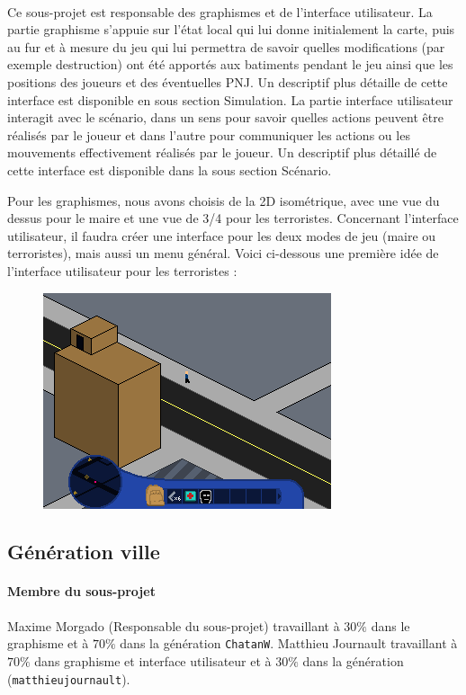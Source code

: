 \documentclass[a4paper,10pt]{article}
\begin{document}
\paragraph{} Ce sous-projet est responsable des graphismes et de l'interface utilisateur. 
La partie graphisme s'appuie sur l'état local qui lui donne initialement la carte, puis au fur et à mesure du jeu qui lui permettra de savoir quelles modifications (par exemple destruction) ont été apportés aux batiments pendant le jeu ainsi que les positions des joueurs et des éventuelles PNJ. Un descriptif plus détaille de cette interface est disponible en sous section Simulation.
La partie interface utilisateur interagit avec le scénario, dans un sens pour savoir quelles actions peuvent être réalisés par le joueur et dans l'autre pour communiquer les actions ou les mouvements effectivement réalisés par le joueur. Un descriptif plus détaillé de cette interface est disponible dans la sous section Scénario.

Pour les graphismes, nous avons choisis de la 2D isométrique, avec une vue du dessus pour le maire et une vue de 3/4 pour les terroristes. 
Concernant l'interface utilisateur, il faudra créer une interface pour les deux modes de jeu (maire ou terroristes), mais aussi un menu général. 
Voici ci-dessous une première idée de l'interface utilisateur pour les terroristes :
\begin{figure}[h]
\centering
 \includegraphics[width = 0.5\linewidth]{TS2014.png}
\end{figure}

\subsection{Génération ville} 
\paragraph{Membre du sous-projet} Maxime Morgado (Responsable du sous-projet) travaillant à  $30\%$ dans le graphisme et à  $70\%$ dans la génération \verb!ChatanW!. Matthieu Journault travaillant à $70\%$ dans graphisme et interface utilisateur et à $30\%$ dans la génération (\verb!matthieujournault!).
\end{document}
